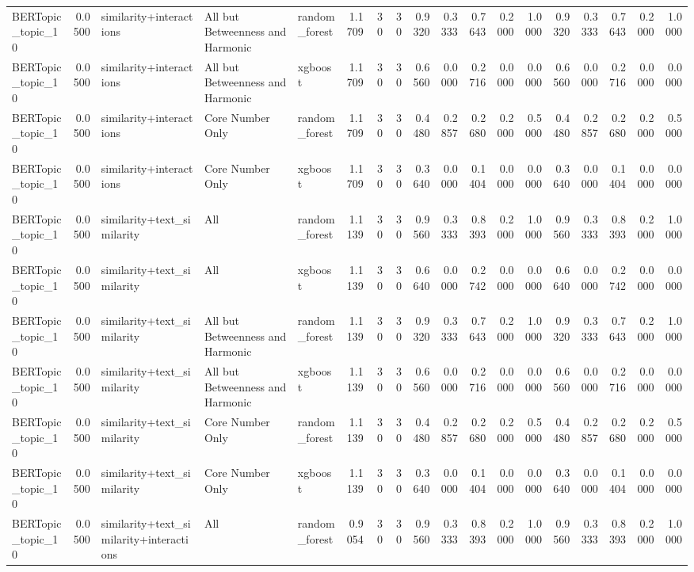 \begin{tabular}{lrlllrrrrrrrrrrrrr}
BERTopic_topic_10 & 0.0500 & similarity+interactions & All but Betweenness and Harmonic & random_forest & 1.1709 & 30 & 30 & 0.9320 & 0.3333 & 0.7643 & 0.2000 & 1.0000 & 0.9320 & 0.3333 & 0.7643 & 0.2000 & 1.0000 \\
BERTopic_topic_10 & 0.0500 & similarity+interactions & All but Betweenness and Harmonic & xgboost & 1.1709 & 30 & 30 & 0.6560 & 0.0000 & 0.2716 & 0.0000 & 0.0000 & 0.6560 & 0.0000 & 0.2716 & 0.0000 & 0.0000 \\
BERTopic_topic_10 & 0.0500 & similarity+interactions & Core Number Only & random_forest & 1.1709 & 30 & 30 & 0.4480 & 0.2857 & 0.2680 & 0.2000 & 0.5000 & 0.4480 & 0.2857 & 0.2680 & 0.2000 & 0.5000 \\
BERTopic_topic_10 & 0.0500 & similarity+interactions & Core Number Only & xgboost & 1.1709 & 30 & 30 & 0.3640 & 0.0000 & 0.1404 & 0.0000 & 0.0000 & 0.3640 & 0.0000 & 0.1404 & 0.0000 & 0.0000 \\
BERTopic_topic_10 & 0.0500 & similarity+text_similarity & All & random_forest & 1.1139 & 30 & 30 & 0.9560 & 0.3333 & 0.8393 & 0.2000 & 1.0000 & 0.9560 & 0.3333 & 0.8393 & 0.2000 & 1.0000 \\
BERTopic_topic_10 & 0.0500 & similarity+text_similarity & All & xgboost & 1.1139 & 30 & 30 & 0.6640 & 0.0000 & 0.2742 & 0.0000 & 0.0000 & 0.6640 & 0.0000 & 0.2742 & 0.0000 & 0.0000 \\
BERTopic_topic_10 & 0.0500 & similarity+text_similarity & All but Betweenness and Harmonic & random_forest & 1.1139 & 30 & 30 & 0.9320 & 0.3333 & 0.7643 & 0.2000 & 1.0000 & 0.9320 & 0.3333 & 0.7643 & 0.2000 & 1.0000 \\
BERTopic_topic_10 & 0.0500 & similarity+text_similarity & All but Betweenness and Harmonic & xgboost & 1.1139 & 30 & 30 & 0.6560 & 0.0000 & 0.2716 & 0.0000 & 0.0000 & 0.6560 & 0.0000 & 0.2716 & 0.0000 & 0.0000 \\
BERTopic_topic_10 & 0.0500 & similarity+text_similarity & Core Number Only & random_forest & 1.1139 & 30 & 30 & 0.4480 & 0.2857 & 0.2680 & 0.2000 & 0.5000 & 0.4480 & 0.2857 & 0.2680 & 0.2000 & 0.5000 \\
BERTopic_topic_10 & 0.0500 & similarity+text_similarity & Core Number Only & xgboost & 1.1139 & 30 & 30 & 0.3640 & 0.0000 & 0.1404 & 0.0000 & 0.0000 & 0.3640 & 0.0000 & 0.1404 & 0.0000 & 0.0000 \\
BERTopic_topic_10 & 0.0500 & similarity+text_similarity+interactions & All & random_forest & 0.9054 & 30 & 30 & 0.9560 & 0.3333 & 0.8393 & 0.2000 & 1.0000 & 0.9560 & 0.3333 & 0.8393 & 0.2000 & 1.0000 \\

\end{tabular}
